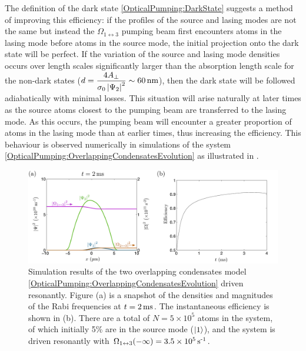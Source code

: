The definition of the dark state \eqref{OpticalPumping:DarkState} suggests a method of improving this efficiency: if the profiles of the source and lasing modes are not the same but instead the $\Omega_{1\leftrightarrow 3}$ pumping beam first encounters atoms in the lasing mode before atoms in the source mode, the initial projection onto the dark state will be perfect.  If the variation of the source and lasing mode densities occurs over length scales significantly larger than the absorption length scale for the non-dark states ($\displaystyle d = \frac{4 A_\perp}{\sigma_0 \abs{\Psi_2}^2} \sim \unit[60]{nm}$), then the dark state will be followed adiabatically with minimal losses.  This situation will arise naturally at later times as the source atoms closest to the pumping beam are transferred to the lasing mode.  As this occurs, the pumping beam will encounter a greater proportion of atoms in the lasing mode than at earlier times, thus increasing the efficiency.  This behaviour is observed numerically in simulations of the system \eqref{OpticalPumping:OverlappingCondensatesEvolution} as illustrated in .

\begin{figure}
    \centering
    \includegraphics[width=15cm]{OverlappingCondensatesZeroDetuning}
    \caption{Simulation results of the two overlapping condensates model \eqref{OpticalPumping:OverlappingCondensatesEvolution} driven resonantly.  Figure (a) is a snapshot of the densities and magnitudes of the Rabi frequencies at $t = \unit[2]{ms}$.  The instantaneous efficiency is shown in (b).  There are a total of $N = 5 \times 10^5$ atoms in the system, of which initially 5\% are in the source mode (${\left|1\right>}$), and the system is driven resonantly with $\Omega_{1\leftrightarrow 3}(-\infty) = 3.5 \times \unit[10^5]{s\textsuperscript{-1}}$.}
    \label{OpticalPumping:OverlappingCondensatesZeroDetuning}
\end{figure}

